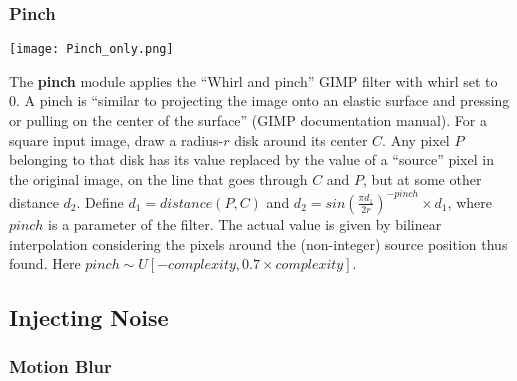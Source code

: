 \documentclass[smallcondensed]{svjour3}     %
\begin{document}
\vspace*{4mm}

\subsubsection*{Pinch}

\begin{minipage}[b]{0.14\linewidth}
\begin{center}
\texttt{[image: Pinch\_only.png]}\\
\vspace*{15mm}
\end{center}
\end{minipage}%
\hspace{0.3cm}\begin{minipage}[b]{0.86\linewidth}
The {\bf pinch} module applies the ``Whirl and pinch'' GIMP filter with whirl set to 0. 
A pinch is ``similar to projecting the image onto an elastic
surface and pressing or pulling on the center of the surface'' (GIMP documentation manual).
For a square input image, draw a radius-$r$ disk
around its center $C$. Any pixel $P$ belonging to
that disk has its value replaced by
the value of a ``source'' pixel in the original image,
on the line that goes through $C$ and $P$, but
at some other distance $d_2$. Define $d_1=distance(P,C)$
and $d_2 = sin(\frac{\pi{}d_1}{2r})^{-pinch} \times
d_1$, where $pinch$ is a parameter of the filter.
The actual value is given by bilinear interpolation considering the pixels
around the (non-integer) source position thus found.
Here $pinch \sim U[-complexity, 0.7 \times complexity]$.
\end{minipage}


\subsection{Injecting Noise}

\subsubsection*{Motion Blur}
\end{document}
